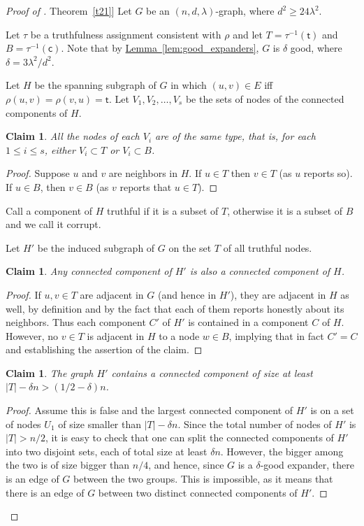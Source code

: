 \documentclass[11pt]{article}
\numberwithin{equation}{section}
\newtheorem{claim}[theorem]{Claim}
\theoremstyle{definition}
\theoremstyle{plain}
\newcommand{\expref}[2]{\hyperref[#2]{#1~\ref{#2}}}
\begin{document}
\noindent
%
\begin{proof}[Proof of \expref{Theorem}{t21}]
Let $G$ be an $(n,d,\lambda)$-graph, where
$d^2 \geq 24 \lambda^2$.

Let $\tau$ be a truthfulness assignment consistent with $\rho$ and let $T = \tau^{-1}(\mathsf{t})$ and 
$B = \tau^{-1}(\mathsf{c})$. 
Note that by \expref{Lemma}{lem:good_expanders}, $G$ is $\delta$ good, where 
$\delta = 3\lambda^2/d^2$. 

Let $H$ be the spanning  subgraph of $G$ in which $(u,v) \in E$ iff
$\rho(u,v) = \rho(v,u) = \mathsf{t}$. %
%
Let $V_1,V_2, \ldots ,V_s$ 
be the sets of nodes of the connected  components of 
$H$. 
\begin{claim}
\label{c21}
All the nodes of each $V_i$ are of the same type, that is, for
each $1 \leq i \leq s$, either $V_i \subset T$ or $V_i \subset B$.
\end{claim}

\begin{proof} Suppose $u$ and $v$ are neighbors in $H$. If $u \in T$
then $v \in T$ (as $u$ reports so). If $u \in B$, then 
$v \in B$ (as $v$ reports that $u \in T$).
\end{proof}

Call a component of $H$ truthful if it is a subset of $T$, 
%
otherwise   %
it is a subset of $B$ and we call it corrupt. 

Let $H'$ be the induced subgraph of $G$ on the set $T$ of all 
%
truthful  %
nodes.
\begin{claim}
\label{c22}
Any connected component of $H'$ is also a connected component of 
$H$.
\end{claim}

\begin{proof} If $u,v \in T$ are adjacent in $G$ (and hence in
$H'$), they are
adjacent in $H$ as well, by definition and by the fact that each of
them reports honestly about its neighbors. Thus each component $C'$ of
$H'$ is contained in a component $C$ of $H$. However, no
$v \in T$ is adjacent in $H$ to a node $w \in B$, implying
that in fact $C'=C$ and establishing the
assertion of the claim.
\end{proof}

\begin{claim}
\label{c23}
The graph $H'$ contains a connected component of size at least
$|T|-\delta n > (1/2-\delta)n$.
\end{claim}

\begin{proof} Assume this is false and the largest connected component
  of $H'$ is on a set of nodes $U_1$ of size smaller than
  $|T|-\delta n$. Since the total number of nodes of $H'$ is
  $|T|>n/2$, it is easy to check that one can split the connected
  components of $H'$ into two disjoint sets, each of total size at
  least $\delta n$. However, the bigger among the two is of size
  bigger than $n/4$, and hence, since $G$ is a $\delta$-good expander,
  there is an edge of $G$ between the two groups. This is impossible,
  as it means that there is an edge of $G$ between two distinct
  connected components of $H'$.
\end{proof}


\end{proof}
\end{document}
